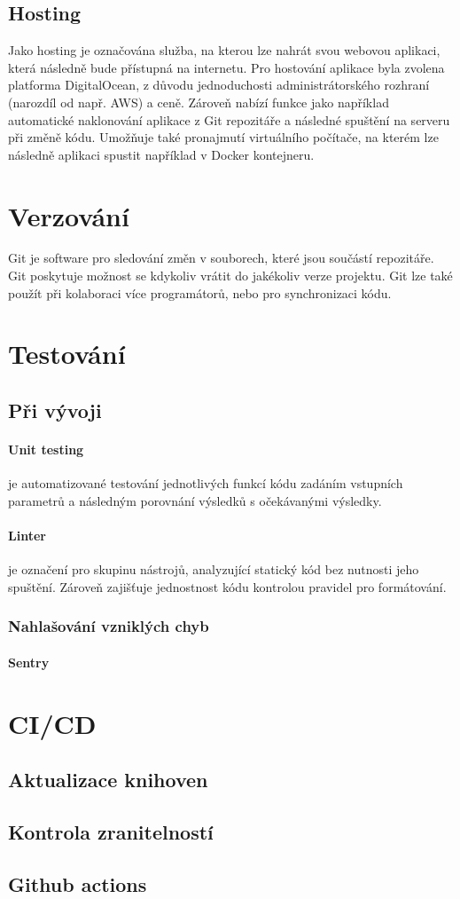 \documentclass[12pt, a4paper,
 twoside,        %
 openright
]{report}
\begin{document}
\subsection{Hosting}
Jako hosting je označována služba, na kterou lze nahrát svou webovou aplikaci, která následně bude přístupná na internetu. Pro hostování aplikace byla zvolena platforma DigitalOcean, z důvodu jednoduchosti administrátorského rozhraní (narozdíl od např. AWS) a ceně. Zároveň nabízí funkce jako například automatické naklonování aplikace z Git repozitáře a následné spuštění na serveru při změně kódu. Umožňuje také pronajmutí virtuálního počítače, na kterém lze následně aplikaci spustit například v Docker kontejneru.

\section{Verzování}
Git je software pro sledování změn v souborech, které jsou součástí repozitáře. Git poskytuje možnost se kdykoliv vrátit do jakékoliv verze projektu. Git lze také použít při kolaboraci více programátorů, nebo pro synchronizaci kódu.
\section{Testování}
\subsection{Při vývoji}
\paragraph{Unit testing} je automatizované testování jednotlivých funkcí kódu zadáním vstupních parametrů a následným porovnání výsledků s očekávanými výsledky.
\paragraph{Linter} je označení pro skupinu nástrojů, analyzující statický kód bez nutnosti jeho spuštění. Zároveň zajišťuje jednostnost kódu kontrolou pravidel pro formátování.
\subsubsection{Nahlašování vzniklých chyb}
\paragraph{Sentry}




\section{CI/CD}
\subsection{Aktualizace knihoven}
\subsection{Kontrola zranitelností}
\subsection{Github actions}


\listoffigures


\end{document}
